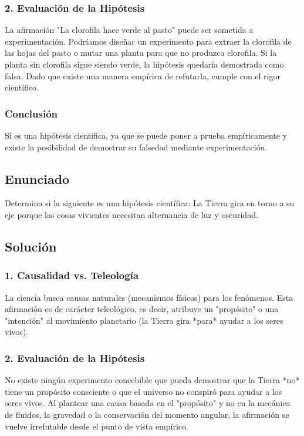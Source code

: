 \documentclass[12pt, a4paper]{article}
\begin{document}
\subsubsection*{2. Evaluación de la Hipótesis}
La afirmación "La clorofila hace verde al pasto" puede ser sometida a experimentación. Podríamos diseñar un experimento para extraer la clorofila de las hojas del pasto o mutar una planta para que no produzca clorofila. Si la planta sin clorofila sigue siendo verde, la hipótesis quedaría demostrada como falsa. Dado que existe una manera empírica de refutarla, cumple con el rigor científico.

\subsubsection*{Conclusión}
Sí es una hipótesis científica, ya que se puede poner a prueba empíricamente y existe la posibilidad de demostrar su falsedad mediante experimentación.

\newpage

\subsection*{Enunciado}
Determina si la siguiente es una hipótesis científica: La Tierra gira en torno a su eje porque las cosas vivientes necesitan alternancia de luz y oscuridad.

\subsection*{Solución}

\subsubsection*{1. Causalidad vs. Teleología}
La ciencia busca causas naturales (mecanismos físicos) para los fenómenos. Esta afirmación es de carácter teleológico, es decir, atribuye un "propósito" o una "intención" al movimiento planetario (la Tierra gira *para* ayudar a los seres vivos). 

\subsubsection*{2. Evaluación de la Hipótesis}
No existe ningún experimento concebible que pueda demostrar que la Tierra *no* tiene un propósito consciente o que el universo no conspiró para ayudar a los seres vivos. Al plantear una causa basada en el "propósito" y no en la mecánica de fluidos, la gravedad o la conservación del momento angular, la afirmación se vuelve irrefutable desde el punto de vista empírico. 
\end{document}
